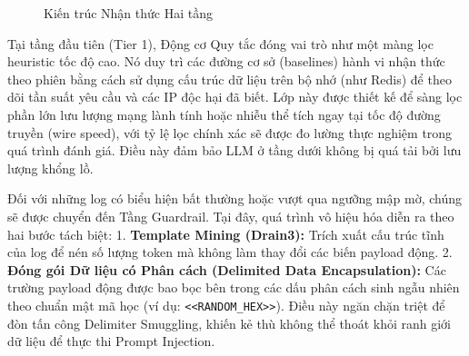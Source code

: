 \documentclass[12pt,a4paper]{article}
\begin{document}
\begin{figure}[H]
{
    }
    \caption{Kiến trúc Nhận thức Hai tầng}
    \label{fig:architecture}
\end{figure}

Tại tầng đầu tiên (Tier 1), Động cơ Quy tắc đóng vai trò như một màng lọc heuristic tốc độ cao. Nó duy trì các đường cơ sở (baselines) hành vi nhận thức theo phiên bằng cách sử dụng cấu trúc dữ liệu trên bộ nhớ (như Redis) để theo dõi tần suất yêu cầu và các IP độc hại đã biết. Lớp này được thiết kế để sàng lọc phần lớn lưu lượng mạng lành tính hoặc nhiễu thể tích ngay tại tốc độ đường truyền (wire speed), với tỷ lệ lọc chính xác sẽ được đo lường thực nghiệm trong quá trình đánh giá. Điều này đảm bảo LLM ở tầng dưới không bị quá tải bởi lưu lượng khổng lồ.

Đối với những log có biểu hiện bất thường hoặc vượt qua ngưỡng mập mờ, chúng sẽ được chuyển đến Tầng Guardrail. Tại đây, quá trình vô hiệu hóa diễn ra theo hai bước tách biệt:
1. \textbf{Template Mining (Drain3):} Trích xuất cấu trúc tĩnh của log để nén số lượng token mà không làm thay đổi các biến payload động.
2. \textbf{Đóng gói Dữ liệu có Phân cách (Delimited Data Encapsulation):} Các trường payload động được bao bọc bên trong các dấu phân cách sinh ngẫu nhiên theo chuẩn mật mã học (ví dụ: \verb|<<RANDOM_HEX>>|). Điều này ngăn chặn triệt để đòn tấn công Delimiter Smuggling, khiến kẻ thù không thể thoát khỏi ranh giới dữ liệu để thực thi Prompt Injection.
\end{document}

